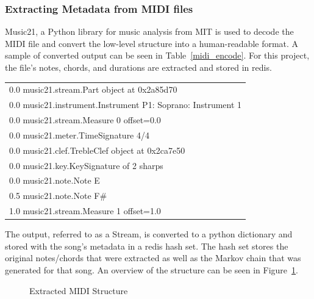 \documentclass[12pt]{article} %
\begin{document}

\subsubsection{Extracting Metadata from MIDI files}
Music21, a Python library for music analysis from MIT \cite{website:music21} is used to decode the MIDI file and convert the low-level structure into a human-readable format. A sample of converted output can be seen in Table~\ref{midi_encode}. For this project, the file's notes, chords, and durations are extracted and stored in redis.


\begin{center}
  \begin{tabular}{|l|}
    \hline
	{0.0} music21.stream.Part object at 0x2a85d70 \\    
	{0.0} music21.instrument.Instrument P1: Soprano: Instrument 1 \\    
	{0.0} music21.stream.Measure 0 offset=0.0 \\         
	{0.0} music21.meter.TimeSignature 4/4 \\         
	{0.0} music21.clef.TrebleClef object at 0x2ca7e50 \\         
	{0.0} music21.key.KeySignature of 2 sharps \\         
	{0.0} music21.note.Note E \\         
	{0.5} music21.note.Note F\# \\     
	{1.0} music21.stream.Measure 1 offset=1.0 \\
    \hline
  \end{tabular}
\label{midi_encode}
\end{center}

The output, referred to as a Stream, is converted to a python  dictionary and stored with the song's metadata in a redis hash set. The hash set stores the original notes/chords that were extracted as well as the Markov chain that was generated for that song. An overview of the structure can be seen in Figure~\ref{fig:md_kb}.

\begin{figure}[H]
\caption{Extracted MIDI Structure}
\label{fig:md_kb}
\end{figure}
\end{document}
